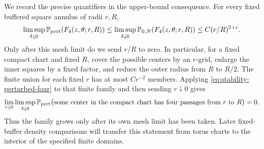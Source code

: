 We record the precise quantifiers in the upper-bound consequence.
For every fixed buffered square annulus of radii $r,R$,
\begin{equation}
 \limsup_{\delta\downarrow0}\P_{\mathrm{pert}}(F_4(z,\theta;r,R))
 \leq
 \limsup_{\delta\downarrow0}\P_{0,N}(F_4(z,\theta;r,R))
 \leq C(r/R)^{2+c}.
 \label{eq:stability-perturbed-four}
\end{equation}
Only after this mesh limit do we send $r/R$ to zero.  In particular,
for a fixed compact chart and fixed $R$, cover the possible centers
by an $r$-grid, enlarge the inner squares by a fixed factor, and
reduce the outer radius from $R$ to $R/2$.
The finite union for each fixed $r$ has at most $C r^{-2}$ members.
Applying \eqref{eq:stability-perturbed-four} to that finite family
and then sending $r\downarrow0$ gives
\begin{equation}
 \lim_{r\downarrow0}\limsup_{\delta\downarrow0}
 \P_{\mathrm{pert}}\bigl(\text{some center in the compact chart has
 four passages from }r\text{ to }R\bigr)=0.
 \label{eq:stability-compact-bottlenecks}
\end{equation}
Thus the family grows only after its own mesh limit has been taken.
Later fixed-buffer density comparisons will transfer this statement
from torus charts to the interior of the specified finite domains.
